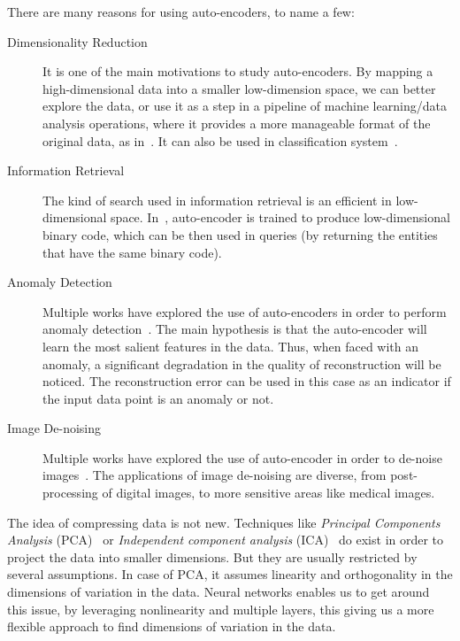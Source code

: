   \par There are many reasons for using auto-encoders, to name a few:
  \begin{description}
    \item [Dimensionality Reduction] It is one of the main motivations to study auto-encoders. By mapping a high-dimensional data into a smaller low-dimension space, we can better explore the data, or use it as a step in a pipeline of machine learning/data analysis operations, where it provides a more manageable format of the original data, as in~\citep{ha2018world}. It can also be used in classification system~\citep{Goodfellow-et-al-2016}.

    \item [Information Retrieval] The kind of search used in information retrieval is an efficient in low-dimensional space. In~\citep{salakhutdinov2009semantic}, auto-encoder is trained to produce low-dimensional binary code, which can be then used in queries (by returning the entities that have the same binary code).

    \item [Anomaly Detection] Multiple works have explored the use of auto-encoders in order to perform anomaly detection~\citep{sakurada2014anomaly,an2015variational,ribeiro2018study}. The main hypothesis is that the auto-encoder will learn the most salient features in the data. Thus, when faced with an anomaly, a significant degradation in the quality of reconstruction will be noticed. The reconstruction error can be used in this case as an indicator if the input data point is an anomaly or not.

    \item [Image De-noising] Multiple works have explored the use of auto-encoder in order to de-noise images~\citep{cho2013boltzmann,cho2013simple,gondara2016medical}. The applications of image de-noising are diverse, from post-processing of digital images, to more sensitive areas like medical images.

  \end{description}

  \par The idea of compressing data is not new. Techniques like \textit{Principal Components Analysis} (PCA)~\citep{jolliffe2011principal} or \textit{Independent component analysis} (ICA)~\citep{hyvarinen2000independent} do exist in order to project the data into smaller dimensions. But they are usually restricted by several assumptions. In case of PCA, it assumes linearity and orthogonality in the dimensions of variation in the data. Neural networks enables us to get around this issue, by leveraging nonlinearity and multiple layers, this giving us a more flexible approach to find dimensions of variation in the data.

